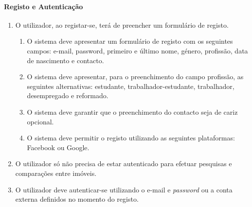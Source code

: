 \paragraph{Registo e Autenticação}
\begin{enumerate}
    \item O utilizador, ao registar-se, terá de preencher um formulário de registo.
    \begin{enumerate}
        \item O sistema deve apresentar um formulário de registo com os seguintes campos: e-mail, password, primeiro e último nome, género, profissão, data de nascimento e contacto.
        \item O sistema deve apresentar, para o preenchimento do campo profissão, as seguintes alternativas: estudante, trabalhador-estudante, trabalhador, desempregado e reformado.
        \item O sistema deve garantir que o preenchimento do contacto seja de cariz opcional.
        \item O sistema deve permitir o registo utilizando as seguintes plataformas: Facebook ou Google.
    \end{enumerate}
    \item O utilizador só não precisa de estar autenticado para efetuar pesquisas e comparações entre imóveis.
    \item O utilizador deve autenticar-se utilizando o e-mail e \textit{password} ou a conta externa definidos no momento do registo.
\end{enumerate}

